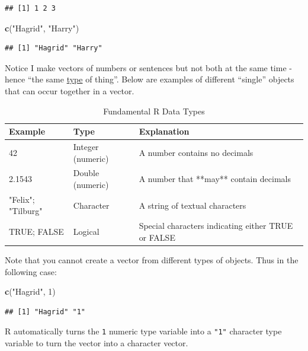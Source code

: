 \documentclass[
]{book}
\newenvironment{Shaded}{\begin{snugshade}}{\end{snugshade}}
\newcommand{\DecValTok}[1]{\textcolor[rgb]{0.00,0.00,0.81}{#1}}
\newcommand{\FunctionTok}[1]{\textcolor[rgb]{0.13,0.29,0.53}{\textbf{#1}}}
\newcommand{\NormalTok}[1]{#1}
\newcommand{\StringTok}[1]{\textcolor[rgb]{0.31,0.60,0.02}{#1}}
\begin{document}
\begin{verbatim}
## [1] 1 2 3
\end{verbatim}

\begin{Shaded}
\begin{Highlighting}[]
\FunctionTok{c}\NormalTok{(}\StringTok{"Hagrid"}\NormalTok{, }\StringTok{"Harry"}\NormalTok{)}
\end{Highlighting}
\end{Shaded}

\begin{verbatim}
## [1] "Hagrid" "Harry"
\end{verbatim}

Notice I make vectors of numbers or sentences but not both at the same time - hence ``the same \ul{type} of thing''. Below are examples of different ``single'' objects that can occur together in a vector.

\begin{table}

\caption{\label{tab:data-types}Fundamental R Data Types}
\centering
\begin{tabular}[t]{lll}
\toprule
Example & Type & Explanation\\
\midrule
42 & Integer (numeric) & A number contains no decimals\\
2.1543 & Double (numeric) & A number that **may** contain decimals\\
"Felix"; "Tilburg" & Character & A string of textual characters\\
TRUE; FALSE & Logical & Special characters indicating either TRUE or FALSE\\
\bottomrule
\end{tabular}
\end{table}

Note that you cannot create a vector from different types of objects. Thus in the following case:

\begin{Shaded}
\begin{Highlighting}[]
\FunctionTok{c}\NormalTok{(}\StringTok{"Hagrid"}\NormalTok{, }\DecValTok{1}\NormalTok{)}
\end{Highlighting}
\end{Shaded}

\begin{verbatim}
## [1] "Hagrid" "1"
\end{verbatim}

R automatically turns the \texttt{1} numeric type variable into a \texttt{"1"} character type variable to turn the vector into a character vector.
\end{document}
